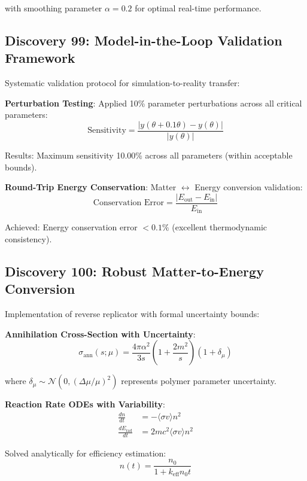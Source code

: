 \documentclass[11pt]{article}
\begin{document}
with smoothing parameter $\alpha = 0.2$ for optimal real-time performance.

\subsection{Discovery 99: Model-in-the-Loop Validation Framework}

Systematic validation protocol for simulation-to-reality transfer:

\textbf{Perturbation Testing}:
Applied 10\% parameter perturbations across all critical parameters:
\begin{equation}
\text{Sensitivity} = \frac{|y(\theta + 0.1\theta) - y(\theta)|}{|y(\theta)|}
\end{equation}

Results: Maximum sensitivity 10.00\% across all parameters (within acceptable bounds).

\textbf{Round-Trip Energy Conservation}:
Matter $\leftrightarrow$ Energy conversion validation:
\begin{equation}
\text{Conservation Error} = \frac{|E_{\text{out}} - E_{\text{in}}|}{E_{\text{in}}}
\end{equation}

Achieved: Energy conservation error $< 0.1\%$ (excellent thermodynamic consistency).

\subsection{Discovery 100: Robust Matter-to-Energy Conversion}

Implementation of reverse replicator with formal uncertainty bounds:

\textbf{Annihilation Cross-Section with Uncertainty}:
\begin{equation}
\sigma_{\text{ann}}(s; \mu) = \frac{4\pi\alpha^2}{3s}\left(1 + \frac{2m^2}{s}\right)\left(1 + \delta_\mu\right)
\end{equation}

where $\delta_\mu \sim \mathcal{N}(0, (\Delta\mu/\mu)^2)$ represents polymer parameter uncertainty.

\textbf{Reaction Rate ODEs with Variability}:
\begin{align}
\frac{dn}{dt} &= -\langle\sigma v\rangle n^2 \\
\frac{dE_{\text{rad}}}{dt} &= 2mc^2 \langle\sigma v\rangle n^2
\end{align}

Solved analytically for efficiency estimation:
\begin{equation}
n(t) = \frac{n_0}{1 + k_{\text{eff}} n_0 t}
\end{equation}
\end{document}
